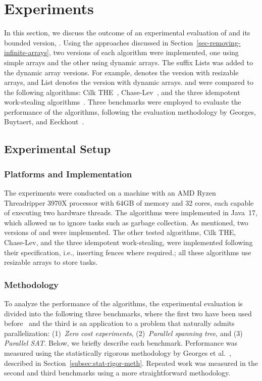 \section{\label{sec-experiments}Experiments}

In this section, we discuss the outcome of an experimental evaluation of \NCWSM and its bounded version, \BNCWSM.  Using the approaches discussed in Section~\ref{sec-removing-infinite-arrays}, two versions of each algorithm were implemented, one using simple arrays and the other using dynamic arrays. The suffix Lists was added to the dynamic array versions. For example, \NCWSM denotes the version with resizable arrays, and \NCWSM List denotes the version with dynamic arrays.  \NCWSM and \BNCWSM were compared to the following algorithms: Cilk THE~\cite{DBLP_conf_pldi_FrigoLR98}, Chase-Lev~\cite{circular.work.stealing}, and the three idempotent work-stealing algorithms~\cite{maged.vechev.2009}.  Three benchmarks were employed to evaluate the performance of the algorithms, following the evaluation methodology by Georges, Buytaert, and Eeckhout~\cite{DBLP_conf_oopsla_GeorgesBE07}.

\subsection{\label{subsec-experimental-setup}Experimental Setup}

\subsubsection{\label{subsec:implementation}Platforms and Implementation}

The experiments were conducted on a machine with an AMD Ryzen Threadripper 3970X processor with 64GB of memory and 32 cores, each capable of executing two hardware threads. The algorithms were implemented in Java~17, which allowed us to ignore tasks such as garbage collection.  As mentioned, two versions of \NCWSM and \BNCWSM were implemented. The other tested algorithms, Cilk THE, Chase-Lev, and the three idempotent work-stealing, were implemented following their specification, i.e., inserting fences where required.; all these algorithms use resizable arrays to store tasks.

\subsubsection{\label{subsec:methodology}Methodology}

To analyze the performance of the algorithms, the experimental evaluation is divided into the following three benchmarks, where the first two have been used before~\cite{DBLP_conf_pldi_FrigoLR98, maged.vechev.2009, fencefreework} and the third is an application to a problem that naturally admits parallelization: (1)~\textit{Zero cost experiments}, (2)~\textit{Parallel spanning tree}, and (3) \textit{Parallel SAT}. Below, we briefly describe each benchmark.  Performance was measured using the statistically rigorous methodology by Georges et al.~\cite{DBLP_conf_oopsla_GeorgesBE07}, described in Section~\ref{subsec:stat-rigor-meth}.  Repeated work was measured in the second and third benchmarks using a more straightforward methodology.

